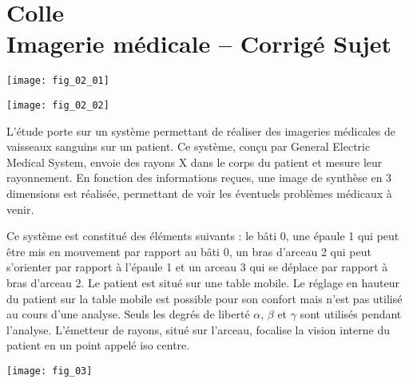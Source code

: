 \chapter*{Colle  \\
Imagerie médicale -- \ifprof Corrigé \else Sujet \fi}


\iflivret {} \else
\ifprof  {} \else \fi
\fi
\setcounter{question}{0}





\begin{marginfigure}
\texttt{[image: fig\_02\_01]}
\end{marginfigure}

\begin{marginfigure}
\texttt{[image: fig\_02\_02]}
\end{marginfigure}

L'étude porte sur un système permettant de réaliser des imageries médicales de vaisseaux sanguins sur un patient. Ce système, conçu par General Electric Medical System, envoie des rayons X dans le corps du patient et mesure leur rayonnement. En fonction des informations reçues, une image de synthèse en 3 dimensions est réalisée, permettant de voir les éventuels problèmes médicaux à venir. 

 Ce système est constitué des éléments suivants : le bâti 0, une épaule 1 qui peut être mis en mouvement par rapport au bâti 0, un bras d’arceau 2 qui peut s’orienter par rapport à l’épaule 1 et un arceau 3 qui se déplace par rapport à bras d’arceau 2. Le patient est situé sur une table mobile. Le réglage en hauteur du patient sur la table mobile est possible pour son confort mais n'est pas utilisé au cours d'une analyse. Seuls les degrés de liberté $\alpha$, $\beta$ et $\gamma$ sont utilisés pendant l’analyse. L'émetteur de rayons, situé sur l'arceau, focalise la vision interne du patient en un point appelé iso centre. 

\begin{marginfigure}
\texttt{[image: fig\_03]}
\end{marginfigure}

